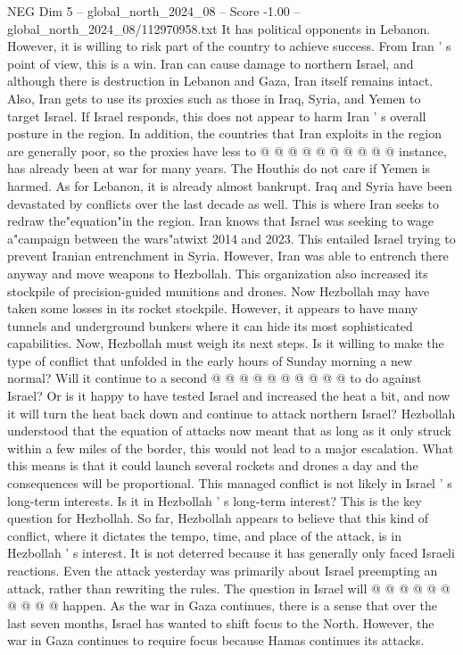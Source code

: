 \begin{textsample}{NEG Dim 5 – global\_north\_2024\_08 – Score -1.00 – global\_north\_2024\_08/112970958.txt}
It has political opponents in Lebanon.
However, it is willing to risk part of the country to achieve success.
From Iran ' s point of view, this is a win.
Iran can cause damage to northern Israel, and although there is destruction in Lebanon and Gaza, Iran itself remains intact.
Also, Iran gets to use its proxies such as those in Iraq, Syria, and Yemen to target Israel.
If Israel responds, this does not appear to harm Iran ' s overall posture in the region.
In addition, the countries that Iran exploits in the region are generally poor, so the proxies have less to @ @ @ @ @ @ @ @ @ @ instance, has already been at war for many years.
The Houthis do not care if Yemen is harmed.
As for Lebanon, it is already almost bankrupt.
Iraq and Syria have been devastated by conflicts over the last decade as well.
This is where Iran seeks to redraw the"equation"in the region.
Iran knows that Israel was seeking to wage a"campaign between the wars"atwixt 2014 and 2023.
This entailed Israel trying to prevent Iranian entrenchment in Syria.
However, Iran was able to entrench there anyway and move weapons to Hezbollah.
This organization also increased its stockpile of precision-guided munitions and drones.
Now Hezbollah may have taken some losses in its rocket stockpile.
However, it appears to have many tunnels and underground bunkers where it can hide its most sophisticated capabilities.
Now, Hezbollah must weigh its next steps.
Is it willing to make the type of conflict that unfolded in the early hours of Sunday morning a new normal?
Will it continue to a second @ @ @ @ @ @ @ @ @ @ to do against Israel?
Or is it happy to have tested Israel and increased the heat a bit, and now it will turn the heat back down and continue to attack northern Israel?
Hezbollah understood that the equation of attacks now meant that as long as it only struck within a few miles of the border, this would not lead to a major escalation.
What this means is that it could launch several rockets and drones a day and the consequences will be proportional.
This managed conflict is not likely in Israel ' s long-term interests.
Is it in Hezbollah ' s long-term interest?
This is the key question for Hezbollah.
So far, Hezbollah appears to believe that this kind of conflict, where it dictates the tempo, time, and place of the attack, is in Hezbollah ' s interest.
It is not deterred because it has generally only faced Israeli reactions.
Even the attack yesterday was primarily about Israel preempting an attack, rather than rewriting the rules.
The question in Israel will @ @ @ @ @ @ @ @ @ @ happen.
As the war in Gaza continues, there is a sense that over the last seven months, Israel has wanted to shift focus to the North.
However, the war in Gaza continues to require focus because Hamas continues its attacks.

\end{textsample}

